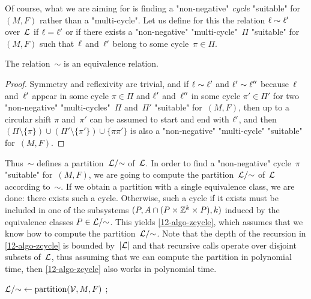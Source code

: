 \begin{scope}
Of course, what we are aiming for is finding a "non-negative"
\emph{cycle} "suitable" for $(M,F)$ rather than a "multi-cycle".
Let us define for this the relation $\ell\sim\ell'$ over~$\mathcal L$ if
$\ell=\ell'$ or if there exists a "non-negative" "multi-cycle"~$\Pi$
"suitable" for~$(M,F)$ such that~$\ell$ and~$\ell'$ belong to some
cycle~$\pi\in\Pi$.
\begin{claim}\label{12-cl-sim} The relation~$\sim$ is an equivalence
  relation.\end{claim}
\begin{proof}
  Symmetry and reflexivity are trivial, and if $\ell\sim\ell'$ and
  $\ell'\sim\ell''$ because~$\ell$ and~$\ell'$ appear in some cycle
  $\pi\in\Pi$ and $\ell'$ and~$\ell''$ in some cycle $\pi'\in\Pi'$ for
  two "non-negative" "multi-cycles"~$\Pi$ and~$\Pi'$ "suitable"
  for~$(M,F)$, then up to a circular shift $\pi$ and~$\pi'$ can be
  assumed to start and end with $\ell'$, and then
  $(\Pi\setminus\{\pi\})\cup(\Pi'\setminus\{\pi'\})\cup\{\pi\pi'\}$ is
  also a "non-negative" "multi-cycle" "suitable" for~$(M,F)$.
\end{proof}

Thus~$\sim$ defines a partition~$\mathcal L/{\sim}$ of~$\mathcal L$.
In order to find a "non-negative" cycle~$\pi$ "suitable" for~$(M,F)$,
we are going to compute the partition~$\mathcal L/{\sim}$ of~$\mathcal L$
according to~$\sim$.  If we obtain a partition with a single
equivalence class, we are done: there exists such a cycle.  Otherwise,
such a cycle if it exists must be included in one of the subsystems
$(P,A\cap(P\times\mathbb Z^k\times P),k)$ induced by the equivalence
classes $P\in\mathcal L/{\sim}$.  This yields \cref{12-algo-zcycle}, which
assumes that we know how to compute the partition~$\mathcal L/{\sim}$.  Note
that the depth of the recursion in \cref{12-algo-zcycle} is bounded
by~$|\mathcal L|$ and that recursive calls operate over disjoint subsets
of~$\mathcal L$, thus assuming that we can compute the partition in
polynomial time, then \cref{12-algo-zcycle} also works in polynomial
time.

\begin{algorithm}

  {
    {}}

$\mathcal L/{\sim} \leftarrow \mathrm{partition}(\mathcal V,M,F)$ ;



\end{algorithm}
\end{scope}
